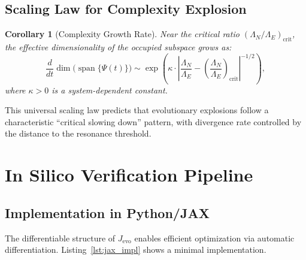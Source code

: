 \documentclass[11pt,a4paper]{article}
\theoremstyle{plain}
\newtheorem{corollary}[theorem]{Corollary}
\theoremstyle{definition}
\theoremstyle{remark}
\begin{document}
\subsection{Scaling Law for Complexity Explosion}

\begin{corollary}[Complexity Growth Rate]
\label{cor:complexity_growth}
Near the critical ratio $(\Lambda_N/\Lambda_E)_{\text{crit}}$, the effective dimensionality of the occupied subspace grows as:
\begin{equation}
\frac{d}{dt} \dim\Big(\operatorname{span}\{\Psi(t)\}\Big) \sim \exp\left( \kappa \cdot \left|\frac{\Lambda_N}{\Lambda_E} - \left(\frac{\Lambda_N}{\Lambda_E}\right)_{\text{crit}}\right|^{-1/2} \right),
\label{eq:complexity_scaling}
\end{equation}
where $\kappa > 0$ is a system-dependent constant.
\end{corollary}

\noindent This universal scaling law predicts that evolutionary explosions follow a characteristic ``critical slowing down'' pattern, with divergence rate controlled by the distance to the resonance threshold.

\section{In Silico Verification Pipeline}
\label{sec:verification}

\subsection{Implementation in Python/JAX}

The differentiable structure of $J_{\text{evo}}$ enables efficient optimization via automatic differentiation. Listing~\ref{lst:jax_impl} shows a minimal implementation.
\end{document}
